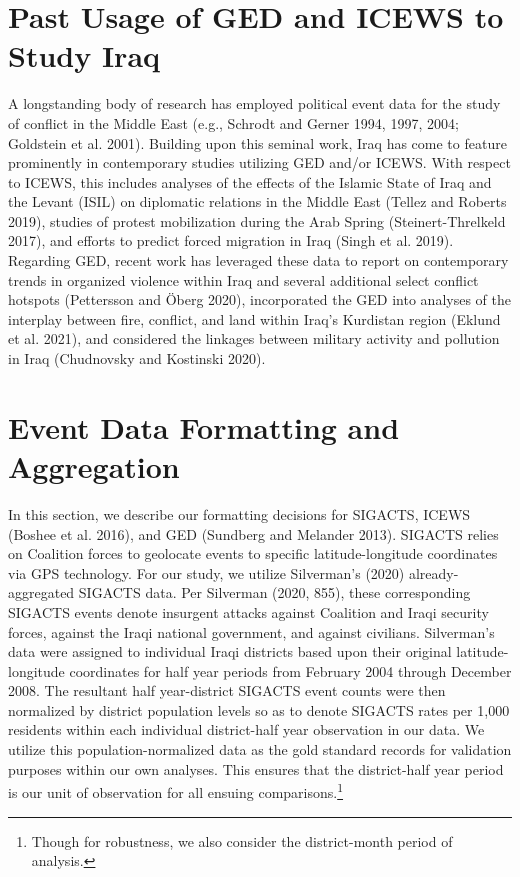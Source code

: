 \documentclass[12pt]{article}
\begin{document}
\section{Past Usage of GED and ICEWS to Study Iraq}
A longstanding body of research has employed political event data for the study of conflict in the Middle East (e.g., Schrodt and Gerner 1994, 1997, 2004; Goldstein et al. 2001). Building upon this seminal work, Iraq has come to feature prominently in contemporary studies utilizing GED and/or ICEWS. With respect to ICEWS, this includes analyses of the effects of the Islamic State of Iraq and the Levant (ISIL) on diplomatic relations in the Middle East (Tellez and Roberts 2019), studies of protest mobilization during the Arab Spring (Steinert-Threlkeld 2017), and efforts to predict forced migration in Iraq (Singh et al. 2019). Regarding GED, recent work has leveraged these data to report on contemporary trends in organized violence within Iraq and several additional select conflict hotspots (Pettersson and \"{O}berg 2020), incorporated the GED into analyses of the interplay between fire, conflict, and land within Iraq's Kurdistan region (Eklund et al. 2021), and considered the linkages between military activity and pollution in Iraq (Chudnovsky and Kostinski 2020).



\section{Event Data Formatting and Aggregation}
In this section, we describe our formatting decisions for SIGACTS, ICEWS (Boshee et al. 2016), and GED (Sundberg and Melander 2013). SIGACTS relies on Coalition forces to geolocate events to specific latitude-longitude coordinates via GPS technology. For our study, we utilize Silverman's (2020) already-aggregated SIGACTS data. Per Silverman (2020, 855), these corresponding SIGACTS events denote insurgent attacks against Coalition and Iraqi security forces, against the Iraqi national government, and against civilians. Silverman's data were assigned to individual Iraqi districts based upon their original latitude-longitude coordinates for half year periods from February 2004 through December 2008. The resultant half year-district SIGACTS event counts were then normalized by district population levels so as to denote SIGACTS rates per 1,000 residents within each individual district-half year observation in our data. We utilize this population-normalized data as the gold standard records for validation purposes within our own analyses. This ensures that the district-half year period is our unit of observation for all ensuing comparisons.\footnote{Though for robustness, we also consider the district-month period of analysis.}
\end{document}
